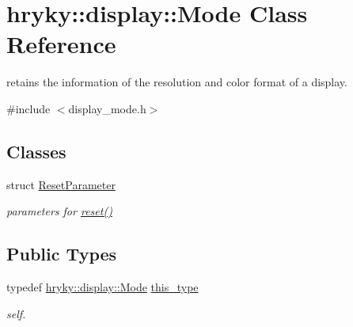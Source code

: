 \hypertarget{classhryky_1_1display_1_1_mode}{\section{hryky\-:\-:display\-:\-:Mode Class Reference}
\label{classhryky_1_1display_1_1_mode}
}


retains the information of the resolution and color format of a display.  




{\ttfamily \#include $<$display\-\_\-mode.\-h$>$}

\subsection*{Classes}
\begin{DoxyCompactItemize}
\item 
struct \hyperlink{structhryky_1_1display_1_1_mode_1_1_reset_parameter}{Reset\-Parameter}
\begin{DoxyCompactList}\small\item\em parameters for \hyperlink{classhryky_1_1display_1_1_mode_a6826c1efd764c64520bf954f480444d4}{reset()} \end{DoxyCompactList}\end{DoxyCompactItemize}
\subsection*{Public Types}
\begin{DoxyCompactItemize}
\item 
\hypertarget{classhryky_1_1display_1_1_mode_a0c68f6c39098781552942da1586968bc}{typedef \hyperlink{classhryky_1_1display_1_1_mode}{hryky\-::display\-::\-Mode} \hyperlink{classhryky_1_1display_1_1_mode_a0c68f6c39098781552942da1586968bc}{this\-\_\-type}}\label{classhryky_1_1display_1_1_mode_a0c68f6c39098781552942da1586968bc}

\begin{DoxyCompactList}\small\item\em self. \end{DoxyCompactList}\end{DoxyCompactItemize}
